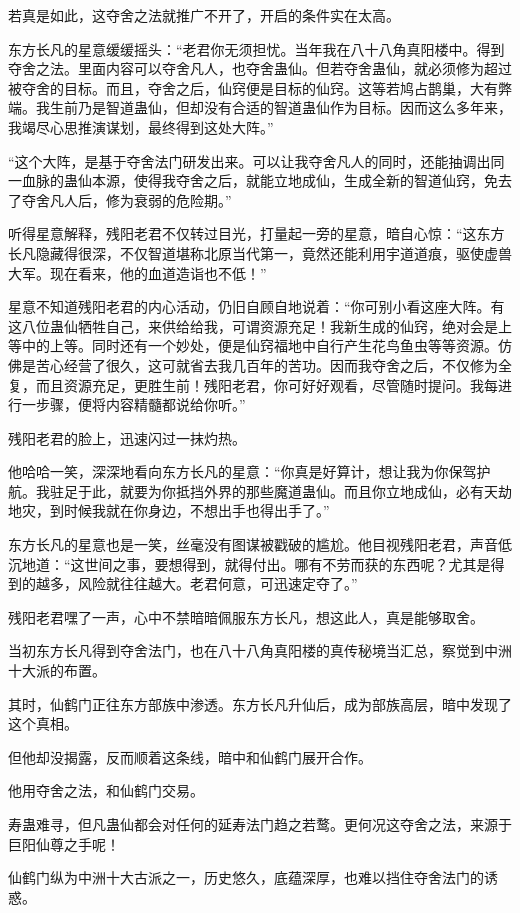 \begin{this_body}
若真是如此，这夺舍之法就推广不开了，开启的条件实在太高。

东方长凡的星意缓缓摇头：“老君你无须担忧。当年我在八十八角真阳楼中。得到夺舍之法。里面内容可以夺舍凡人，也夺舍蛊仙。但若夺舍蛊仙，就必须修为超过被夺舍的目标。而且，夺舍之后，仙窍便是目标的仙窍。这等若鸠占鹊巢，大有弊端。我生前乃是智道蛊仙，但却没有合适的智道蛊仙作为目标。因而这么多年来，我竭尽心思推演谋划，最终得到这处大阵。”

“这个大阵，是基于夺舍法门研发出来。可以让我夺舍凡人的同时，还能抽调出同一血脉的蛊仙本源，使得我夺舍之后，就能立地成仙，生成全新的智道仙窍，免去了夺舍凡人后，修为衰弱的危险期。”

听得星意解释，残阳老君不仅转过目光，打量起一旁的星意，暗自心惊：“这东方长凡隐藏得很深，不仅智道堪称北原当代第一，竟然还能利用宇道道痕，驱使虚兽大军。现在看来，他的血道造诣也不低！”

星意不知道残阳老君的内心活动，仍旧自顾自地说着：“你可别小看这座大阵。有这八位蛊仙牺牲自己，来供给给我，可谓资源充足！我新生成的仙窍，绝对会是上等中的上等。同时还有一个妙处，便是仙窍福地中自行产生花鸟鱼虫等等资源。仿佛是苦心经营了很久，这可就省去我几百年的苦功。因而我夺舍之后，不仅修为全复，而且资源充足，更胜生前！残阳老君，你可好好观看，尽管随时提问。我每进行一步骤，便将内容精髓都说给你听。”

残阳老君的脸上，迅速闪过一抹灼热。

他哈哈一笑，深深地看向东方长凡的星意：“你真是好算计，想让我为你保驾护航。我驻足于此，就要为你抵挡外界的那些魔道蛊仙。而且你立地成仙，必有天劫地灾，到时候我就在你身边，不想出手也得出手了。”

东方长凡的星意也是一笑，丝毫没有图谋被戳破的尴尬。他目视残阳老君，声音低沉地道：“这世间之事，要想得到，就得付出。哪有不劳而获的东西呢？尤其是得到的越多，风险就往往越大。老君何意，可迅速定夺了。”

残阳老君嘿了一声，心中不禁暗暗佩服东方长凡，想这此人，真是能够取舍。

当初东方长凡得到夺舍法门，也在八十八角真阳楼的真传秘境当汇总，察觉到中洲十大派的布置。

其时，仙鹤门正往东方部族中渗透。东方长凡升仙后，成为部族高层，暗中发现了这个真相。

但他却没揭露，反而顺着这条线，暗中和仙鹤门展开合作。

他用夺舍之法，和仙鹤门交易。

寿蛊难寻，但凡蛊仙都会对任何的延寿法门趋之若鹜。更何况这夺舍之法，来源于巨阳仙尊之手呢！

仙鹤门纵为中洲十大古派之一，历史悠久，底蕴深厚，也难以挡住夺舍法门的诱惑。


\end{this_body}
